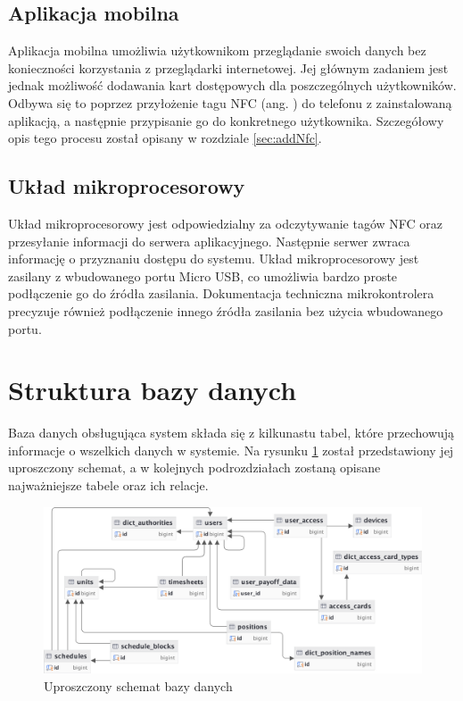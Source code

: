 \subsection{Aplikacja mobilna}

Aplikacja mobilna umożliwia użytkownikom przeglądanie swoich danych bez konieczności korzystania z przeglądarki internetowej. Jej głównym zadaniem jest jednak możliwość dodawania kart dostępowych dla poszczególnych użytkowników. Odbywa się to poprzez przyłożenie tagu NFC (ang. ) do telefonu z zainstalowaną aplikacją, a następnie przypisanie go do konkretnego użytkownika. Szczegółowy opis tego procesu został opisany w rozdziale \ref{sec:addNfc}.

\subsection{Układ mikroprocesorowy}

Układ mikroprocesorowy jest odpowiedzialny za odczytywanie tagów NFC oraz przesyłanie informacji do serwera aplikacyjnego. Następnie serwer zwraca informację o przyznaniu dostępu do systemu. Układ mikroprocesorowy jest zasilany z wbudowanego portu Micro USB, co umożliwia bardzo proste podłączenie go do źródła zasilania. Dokumentacja techniczna mikrokontrolera \cite{bib:picoWdatasheet} precyzuje również podłączenie innego źródła zasilania bez użycia wbudowanego portu.

\section{Struktura bazy danych}


Baza danych obsługująca system składa się z kilkunastu tabel, które przechowują informacje o wszelkich danych w systemie. Na rysunku \ref{fig:dbDiagram} został przedstawiony jej uproszczony schemat, a w kolejnych podrozdziałach zostaną opisane najważniejsze tabele oraz ich relacje.

\begin{figure}[H]
    \centering
    \includegraphics[width=\textwidth]{graf/dbDiagram.png}
    \caption{Uproszczony schemat bazy danych}
    \label{fig:dbDiagram}
\end{figure}

